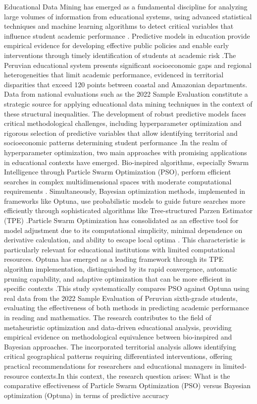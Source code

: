 \documentclass[conference]{IEEEtran}
\begin{document}
Educational Data Mining has emerged as a fundamental discipline for analyzing large volumes of information from educational systems, using advanced statistical techniques and machine learning algorithms to detect critical variables that influence student academic performance \cite{romero2020educational}. Predictive models in education provide empirical evidence for developing effective public policies and enable early interventions through timely identification of students at academic risk \cite{baker2014educational}.The Peruvian educational system presents significant socioeconomic gaps and regional heterogeneities that limit academic performance, evidenced in territorial disparities that exceed 120 points between coastal and Amazonian departments. Data from national evaluations such as the 2022 Sample Evaluation constitute a strategic source for applying educational data mining techniques in the context of these structural inequalities. The development of robust predictive models faces critical methodological challenges, including hyperparameter optimization and rigorous selection of predictive variables that allow identifying territorial and socioeconomic patterns determining student performance \cite{dutt2017systematic}.In the realm of hyperparameter optimization, two main approaches with promising applications in educational contexts have emerged. Bio-inspired algorithms, especially Swarm Intelligence through Particle Swarm Optimization (PSO), perform efficient searches in complex multidimensional spaces with moderate computational requirements \cite{kennedy1995particle}. Simultaneously, Bayesian optimization methods, implemented in frameworks like Optuna, use probabilistic models to guide future searches more efficiently through sophisticated algorithms like Tree-structured Parzen Estimator (TPE) \cite{bergstra2013making}.Particle Swarm Optimization has consolidated as an effective tool for model adjustment due to its computational simplicity, minimal dependence on derivative calculation, and ability to escape local optima \cite{kennedy1995particle}. This characteristic is particularly relevant for educational institutions with limited computational resources. Optuna has emerged as a leading framework through its TPE algorithm implementation, distinguished by its rapid convergence, automatic pruning capability, and adaptive optimization that can be more efficient in specific contexts \cite{akiba2019optuna}.This study systematically compares PSO against Optuna using real data from the 2022 Sample Evaluation of Peruvian sixth-grade students, evaluating the effectiveness of both methods in predicting academic performance in reading and mathematics. The research contributes to the field of metaheuristic optimization and data-driven educational analysis, providing empirical evidence on methodological equivalence between bio-inspired and Bayesian approaches. The incorporated territorial analysis allows identifying critical geographical patterns requiring differentiated interventions, offering practical recommendations for researchers and educational managers in limited-resource contexts.In this context, the research question arises: What is the comparative effectiveness of Particle Swarm Optimization (PSO) versus Bayesian optimization (Optuna) in terms of predictive accuracy 
\end{document}
